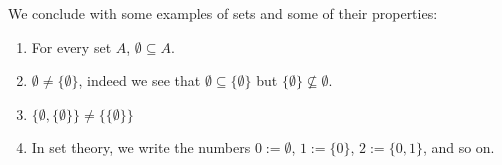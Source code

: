 \begin{example}
   We conclude with some examples of sets and some of their properties:
   \begin{enumerate}
      \item For every set $A$, $\emptyset \subseteq A$.
   \item $\emptyset \neq \{\emptyset\}$, indeed we see that $\emptyset \subseteq \{\emptyset\}$ but $\{\emptyset\} \not\subseteq \emptyset$. 
   \item $\{\emptyset, \{\emptyset\}\} \neq \{\{\emptyset\}\}$
   \item In set theory, we write the numbers $0 := \emptyset$, $1 := \{0\}$, $2 := \{0,1\}$, and so on.
   \end{enumerate}
\end{example}


